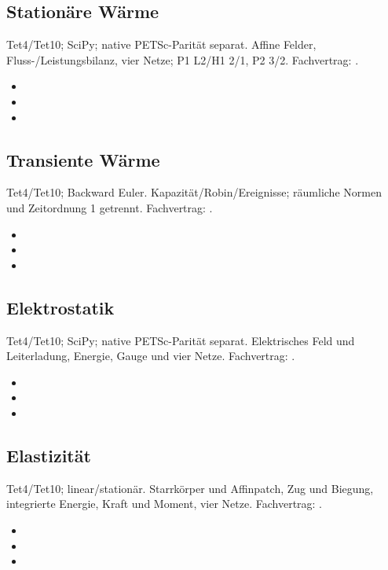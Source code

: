 \subsection{Stationäre Wärme}
\label{sec:vv-heat}
Tet4/Tet10; SciPy; native PETSc-Parität separat. Affine Felder, Fluss-/Leistungsbilanz, vier Netze; P1 L2/H1 2/1, P2 3/2.
Fachvertrag: .
\begin{itemize}
\item {}
\item {}
\item {}
\end{itemize}
\subsection{Transiente Wärme}
\label{sec:vv-transient_heat}
Tet4/Tet10; Backward Euler. Kapazität/Robin/Ereignisse; räumliche Normen und Zeitordnung 1 getrennt.
Fachvertrag: .
\begin{itemize}
\item {}
\item {}
\item {}
\end{itemize}
\subsection{Elektrostatik}
\label{sec:vv-electrostatics}
Tet4/Tet10; SciPy; native PETSc-Parität separat. Elektrisches Feld und Leiterladung, Energie, Gauge und vier Netze.
Fachvertrag: .
\begin{itemize}
\item {}
\item {}
\item {}
\end{itemize}
\subsection{Elastizität}
\label{sec:vv-elasticity}
Tet4/Tet10; linear/stationär. Starrkörper und Affinpatch, Zug und Biegung, integrierte Energie, Kraft und Moment, vier Netze.
Fachvertrag: .
\begin{itemize}
\item {}
\item {}
\item {}
\end{itemize}
